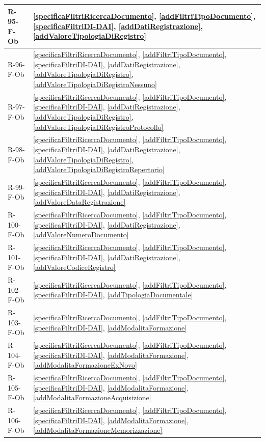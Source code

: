 \begin{longtable}{|p{4cm}|p{10cm}|}
\hline
R-95-F-Ob & \ref{specificaFiltriRicercaDocumento}, \ref{addFiltriTipoDocumento}, \ref{specificaFiltriDI-DAI}, \ref{addDatiRegistrazione}, \ref{addValoreTipologiaDiRegistro} \\
\hline
R-96-F-Ob & \ref{specificaFiltriRicercaDocumento}, \ref{addFiltriTipoDocumento}, \ref{specificaFiltriDI-DAI}, \ref{addDatiRegistrazione}, \ref{addValoreTipologiaDiRegistro}, \ref{addValoreTipologiaDiRegistroNessuno} \\
\hline
R-97-F-Ob & \ref{specificaFiltriRicercaDocumento}, \ref{addFiltriTipoDocumento}, \ref{specificaFiltriDI-DAI}, \ref{addDatiRegistrazione}, \ref{addValoreTipologiaDiRegistro}, \ref{addValoreTipologiaDiRegistroProtocollo} \\
\hline
R-98-F-Ob & \ref{specificaFiltriRicercaDocumento}, \ref{addFiltriTipoDocumento}, \ref{specificaFiltriDI-DAI}, \ref{addDatiRegistrazione}, \ref{addValoreTipologiaDiRegistro}, \ref{addValoreTipologiaDiRegistroRepertorio} \\
\hline
R-99-F-Ob & \ref{specificaFiltriRicercaDocumento}, \ref{addFiltriTipoDocumento}, \ref{specificaFiltriDI-DAI}, \ref{addDatiRegistrazione}, \ref{addValoreDataRegistrazione} \\
\hline
R-100-F-Ob & \ref{specificaFiltriRicercaDocumento}, \ref{addFiltriTipoDocumento}, \ref{specificaFiltriDI-DAI}, \ref{addDatiRegistrazione}, \ref{addValoreNumeroDocumento} \\
\hline
R-101-F-Ob & \ref{specificaFiltriRicercaDocumento}, \ref{addFiltriTipoDocumento}, \ref{specificaFiltriDI-DAI}, \ref{addDatiRegistrazione}, \ref{addValoreCodiceRegistro} \\
\hline
R-102-F-Ob & \ref{specificaFiltriRicercaDocumento}, \ref{addFiltriTipoDocumento}, \ref{specificaFiltriDI-DAI}, \ref{addTipologiaDocumentale} \\
\hline
R-103-F-Ob & \ref{specificaFiltriRicercaDocumento}, \ref{addFiltriTipoDocumento}, \ref{specificaFiltriDI-DAI}, \ref{addModalitaFormazione} \\
\hline
R-104-F-Ob & \ref{specificaFiltriRicercaDocumento}, \ref{addFiltriTipoDocumento}, \ref{specificaFiltriDI-DAI}, \ref{addModalitaFormazione}, \ref{addModalitaFormazioneExNovo} \\
\hline
R-105-F-Ob & \ref{specificaFiltriRicercaDocumento}, \ref{addFiltriTipoDocumento}, \ref{specificaFiltriDI-DAI}, \ref{addModalitaFormazione}, \ref{addModalitaFormazioneAcquisizione} \\
\hline
R-106-F-Ob & \ref{specificaFiltriRicercaDocumento}, \ref{addFiltriTipoDocumento}, \ref{specificaFiltriDI-DAI}, \ref{addModalitaFormazione}, \ref{addModalitaFormazioneMemorizzazione} \\

\end{longtable}
